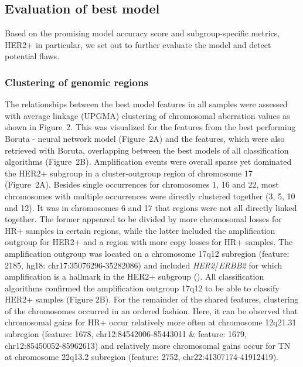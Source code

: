\subsection{Evaluation of best model}
    Based on the promising model accuracy score and subgroup-specific metrics, HER2+ in particular, we set out to further evaluate the model and detect potential flaws.
    
    \subsubsection{Clustering of genomic regions}
        The relationships between the best model features in all samples were assessed with average linkage (UPGMA) clustering of chromosomal aberration values as shown in Figure~2\vphantom{\ref{fig:02}}. This was visualized for the features from the best performing Boruta - neural network model (Figure~2A\vphantom{\ref{fig:02}}) and the features, which were also retrieved with Boruta, overlapping between the best models of all classification algorithms (Figure~2B\vphantom{\ref{fig:02}}).
        Amplification events were overall sparse yet dominated the HER2+ subgroup in a cluster-outgroup region of chromosome 17 (Figure~2A\vphantom{\ref{fig:02}}). Besides single occurrences for chromosomes 1, 16 and 22, most chromosomes with multiple occurrences were directly clustered together (3, 5, 10 and 12). It was in chromosomes 6 and 17 that regions were not all directly linked together. The former appeared to be divided by more chromosomal losses for HR+ samples in certain regions, while the latter included the amplification outgroup for HER2+ and a region with more copy losses for HR+ samples. The amplification outgroup was located on a chromosome 17q12 subregion (feature: 2185, hg18: chr17:35076296-35282086) and included \textit{HER2}/\textit{ERBB2} for which amplification is a hallmark in the HER2+ subgroup (\citealp{Harbeck2019}). All classification algorithms confirmed the amplification outgroup 17q12 to be able to classify HER2+ samples (Figure 2B). For the remainder of the shared features, clustering of the chromosomes occurred in an ordered fashion. Here, it can be observed that chromosomal gains for HR+ occur relatively more often at chromosome 12q21.31 subregion (feature: 1678, chr12:84542006-85443011 \& feature: 1679, chr12:85450052-85962613) and relatively more chromosomal gains occur for TN at chromosome 22q13.2 subregion (feature: 2752, chr22:41307174-41912419).
        
